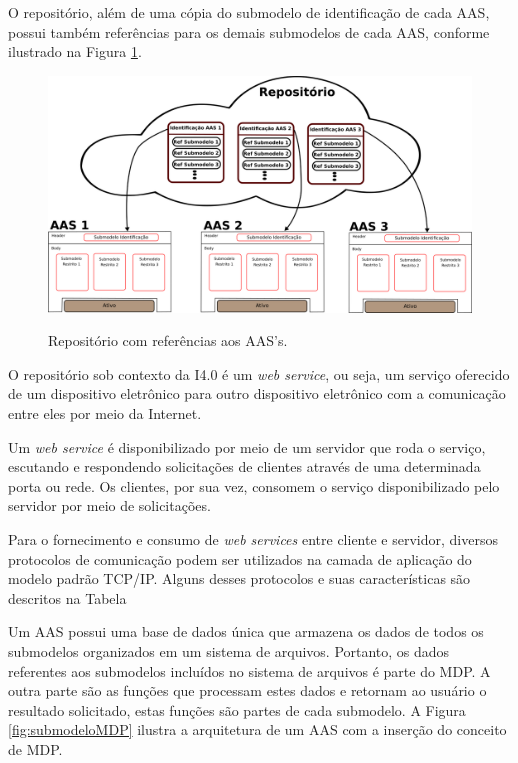 \documentclass[
	12pt,				%
	oneside,			%
	a4paper,			%
	english,			%
	brazil				%
]{abntex2}
\begin{document}
	O repositório, além de uma cópia do submodelo de identificação de cada AAS, possui também referências para os demais submodelos de cada AAS, conforme ilustrado na Figura \ref{fig:repositorio}.
	
	
	\begin{figure}[H]
		\centering
		\caption{Repositório com referências aos AAS's.}
		\includegraphics[width=1\textwidth]{repositorio.png}
		\label{fig:repositorio}
	\end{figure}
	
	O repositório sob contexto da I4.0 é um \textit{web service}, ou seja, um serviço oferecido de um dispositivo eletrônico para outro dispositivo eletrônico com a comunicação entre eles por meio da Internet.
	
	Um \textit{web service} é disponibilizado por meio de um servidor que roda o serviço, escutando e respondendo solicitações de clientes através de uma determinada porta ou rede. Os clientes, por sua vez, consomem o serviço disponibilizado pelo servidor por meio de solicitações.
	
	Para o fornecimento e consumo de \textit{web services} entre cliente e servidor, diversos protocolos de comunicação podem ser utilizados na camada de aplicação do modelo padrão TCP/IP. Alguns desses protocolos e suas características são descritos na Tabela
	
	
	
	
	
	
	Um AAS possui uma base de dados única que armazena os dados de todos os submodelos organizados em um sistema de arquivos. Portanto, os dados referentes aos submodelos incluídos no sistema de arquivos é parte do MDP. A outra parte são as funções que processam estes dados e retornam ao usuário o resultado solicitado, estas funções são partes de cada submodelo. A Figura \ref{fig:submodeloMDP} ilustra a arquitetura de um AAS com a inserção do conceito de MDP.
	
\end{document}

